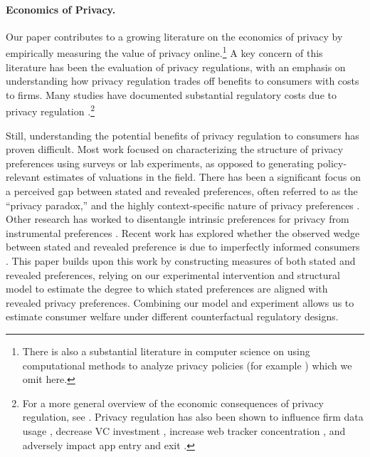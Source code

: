 \documentclass[12pt]{article}
\theoremstyle{definition}
\theoremstyle{remark}
\begin{document}
\paragraph{Economics of Privacy.} Our paper contributes to a growing literature on the economics of privacy \citep{acquisti2016economics, goldfarb2023economics} by empirically measuring the value of privacy online.\footnote{There is also a substantial literature in computer science on using computational methods to analyze privacy policies (for example \citep{amos2021privacy, wagner2022privacy, tang2023policygpt}) which we omit here.} A key concern of this literature has been the evaluation of privacy regulations, with an emphasis on understanding how privacy regulation trades off benefits to consumers with costs to firms. Many studies have documented substantial regulatory costs due to privacy regulation \citep{goldfarb2011privacy, johnson2020consumer, goldberg2023regulating, aridor2023effect, wernerfelt2025estimating, aridor2024privacy, alcobendas2026impact}.\footnote{For a more general overview of the economic consequences of privacy regulation, see \cite{johnson20244}. Privacy regulation has also been shown to influence firm data usage \citep{demirer2024data}, decrease VC investment \citep{jia2021short}, increase web tracker concentration \citep{johnson2023privacy, peukert2022regulatory}, and adversely impact app entry and exit \citep{janssen2022gdpr}.} 

Still, understanding the potential benefits of privacy regulation to consumers has proven difficult. Most work focused on characterizing the structure of privacy preferences using surveys or lab experiments, as opposed to generating policy-relevant estimates of valuations in the field. There has been a significant focus on a perceived gap between stated and revealed preferences, often referred to as the ``privacy paradox,'' \citep{spiekermann2001privacy, acquisti2006imagined, norberg2007privacy, athey2025digital} and the highly context-specific nature of privacy preferences \citep{acquisti2013privacy}. Other research has worked to disentangle intrinsic preferences for privacy from instrumental preferences \citep{lin2022}. Recent work has explored whether the observed wedge between stated and revealed preference is due to imperfectly informed consumers  \citep{tsai2011effect, f4d6c48d-b77c-3568-b51c-5946aee2b9de, adjerid2019choice, bian2021supply, infromationfrictions}. This paper builds upon this work by constructing measures of both stated and revealed preferences, relying on our experimental intervention and structural model to estimate the degree to which stated preferences are aligned with revealed privacy preferences. Combining our model and experiment allows us to estimate consumer welfare under different counterfactual regulatory designs.
\end{document}

